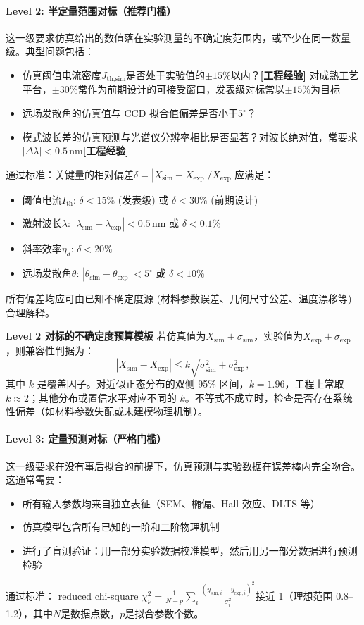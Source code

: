 \paragraph{Level 2: 半定量范围对标（推荐门槛）}
这一级要求仿真给出的数值落在实验测量的不确定度范围内，或至少在同一数量级。典型问题包括：
\begin{itemize}
  \item 仿真阈值电流密度$J_{\text{th,sim}}$是否处于实验值的$\pm 15\%$以内？\textbf{[工程经验]} 对成熟工艺平台，$\pm 30\%$常作为前期设计的可接受窗口，发表级对标常以$\pm 15\%$为目标
  \item 远场发散角的仿真值与 CCD 拟合值偏差是否小于$5^\circ$？
  \item 模式波长差的仿真预测与光谱仪分辨率相比是否显著？对波长绝对值，常要求$|\Delta\lambda| < 0.5\,\mathrm{nm}$\textbf{[工程经验]}
\end{itemize}
通过标准：关键量的相对偏差$\delta = |X_{\text{sim}}-X_{\text{exp}}|/X_{\text{exp}}$ 应满足：
\begin{itemize}
  \item 阈值电流$I_{\mathrm{th}}$: $\delta < 15\%$ (发表级) 或 $\delta < 30\%$ (前期设计)
  \item 激射波长$\lambda$: $|\lambda_{\text{sim}}-\lambda_{\text{exp}}| < 0.5\,\mathrm{nm}$ 或 $\delta < 0.1\%$
  \item 斜率效率$\eta_d$: $\delta < 20\%$
  \item 远场发散角$\theta$: $|\theta_{\text{sim}}-\theta_{\text{exp}}| < 5^\circ$ 或 $\delta < 10\%$
\end{itemize}
所有偏差均应可由已知不确定度源 (材料参数误差、几何尺寸公差、温度漂移等) 合理解释。

\begin{ExperimentalAlignmentBox}
\textbf{Level 2 对标的不确定度预算模板}
若仿真值为$X_{\text{sim}} \pm \sigma_{\text{sim}}$，实验值为$X_{\text{exp}} \pm \sigma_{\text{exp}}$，则兼容性判据为：
\[
|X_{\text{sim}} - X_{\text{exp}}| \leq k \sqrt{\sigma_{\text{sim}}^2 + \sigma_{\text{exp}}^2},
\]
其中 $k$ 是覆盖因子。对近似正态分布的双侧 95\% 区间，$k=1.96$，工程上常取 $k\approx2$；其他分布或置信水平对应不同的 $k$。不等式不成立时，检查是否存在系统性偏差（如材料参数失配或未建模物理机制）。
\end{ExperimentalAlignmentBox}

\paragraph{Level 3: 定量预测对标（严格门槛）}
这一级要求在没有事后拟合的前提下，仿真预测与实验数据在误差棒内完全吻合。这通常需要：
\begin{itemize}
  \item 所有输入参数均来自独立表征（SEM、椭偏、Hall 效应、DLTS 等）
  \item 仿真模型包含所有已知的一阶和二阶物理机制
  \item 进行了盲测验证：用一部分实验数据校准模型，然后用另一部分数据进行预测检验
\end{itemize}
通过标准： reduced chi-square $\chi_\nu^2 = \frac{1}{N-p}\sum_i \frac{(y_{\text{sim},i}-y_{\text{exp},i})^2}{\sigma_i^2}$接近 1（理想范围 0.8--1.2），其中$N$是数据点数，$p$是拟合参数个数。

